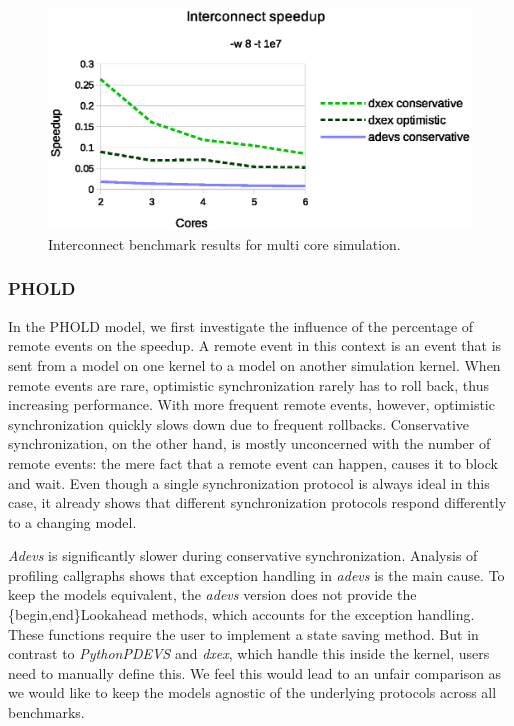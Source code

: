 \begin{figure}
	\center
	\includegraphics[width=\columnwidth]{fig/interconnect_parallel.eps}
	\caption{Interconnect benchmark results for multi core simulation.}
	\label{fig:interconnect_benchmark_parallel}
\end{figure}

\subsubsection{PHOLD}
In the PHOLD model, we first investigate the influence of the percentage of remote events on the speedup.
A remote event in this context is an event that is sent from a model on one kernel to a model on another simulation kernel.
When remote events are rare, optimistic synchronization rarely has to roll back, thus increasing performance.
With more frequent remote events, however, optimistic synchronization quickly slows down due to frequent rollbacks.
Conservative synchronization, on the other hand, is mostly unconcerned with the number of remote events: the mere fact that a remote event can happen, causes it to block and wait.
Even though a single synchronization protocol is always ideal in this case, it already shows that different synchronization protocols respond differently to a changing model.

\textit{Adevs} is significantly slower during conservative synchronization.
Analysis of profiling callgraphs shows that exception handling in \textit{adevs} is the main cause. 
To keep the models equivalent, the \textit{adevs} version does not provide the \{begin,end\}Lookahead methods, which accounts for the exception handling.
These functions require the user to implement a state saving method.
But in contrast to \textit{PythonPDEVS} and \textit{dxex}, which handle this inside the kernel, users need to manually define this.
We feel this would lead to an unfair comparison as we would like to keep the models agnostic of the underlying protocols across all benchmarks.

